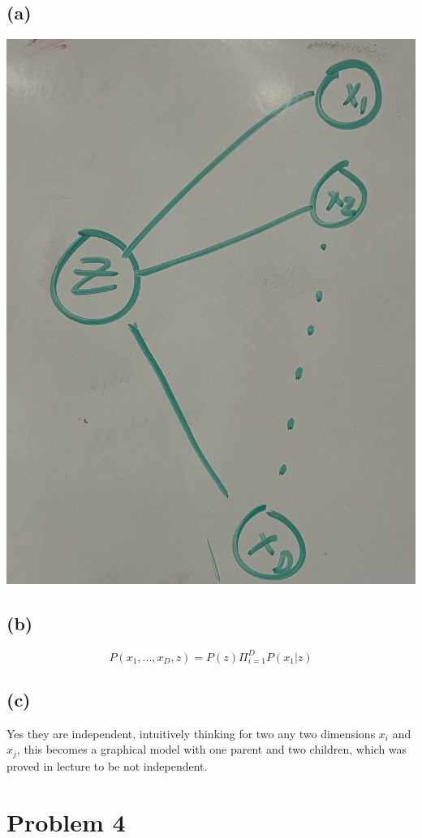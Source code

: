 \documentclass[12pt]{article}
\begin{document}
\subsection*{(a)}
\includegraphics[scale=0.2]{fig1.jpg}
\subsection*{(b)}
$$P(x_1,...,x_D,z)=\boxed{P(z)\Pi_{i=1}^{D}P(x_1|z)}$$
\subsection*{(c)}
Yes they are independent, intuitively thinking for two any two dimensions $x_i$ and $x_j$, this becomes a graphical model with one parent and two children, which was proved in lecture to 
be not independent.

 \section*{Problem 4}
\end{document}
